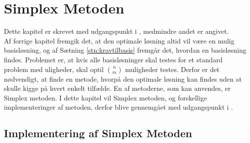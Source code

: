 \chapter{Simplex Metoden}\label{chap:simp}
Dette kapitel er skrevet med udgangspunkt i \citep{bert}, medmindre andet er angivet. \\
Af forrige kapitel fremgik det, at den optimale løsning altid vil være en mulig basisløsning, og af Sætning \ref{stn:kravtilbasis}
fremgår det, hvordan en basisløsning findes. 
Problemet er, at hvis alle basisløsninger skal testes for et standard problem med uligheder, skal optil $\binom{n}{m}$ muligheder testes. 
Derfor er det nødvendigt, at finde en metode, hvorpå den optimale løsning kan findes uden at skulle kigge på hvert enkelt tilfælde. 
En af metoderne, som kan anvendes, er Simplex metoden. I dette kapitel vil Simplex metoden, og forskellige implementeringer af metoden, derfor blive gennemgået med udgangspunkt i .



\section{Implementering af Simplex Metoden}



